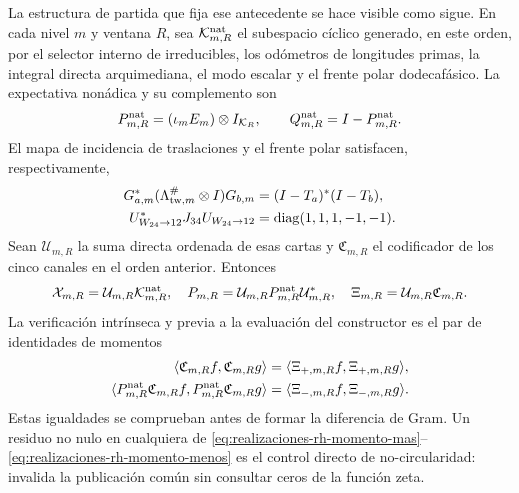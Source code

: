 La estructura de partida que fija ese antecedente se hace visible como
sigue. En cada nivel \(m\) y ventana \(R\), sea
\(\mathcal K_{m,R}^{\rm nat}\) el subespacio cíclico generado, en este
orden, por el selector interno de irreducibles, los odómetros de longitudes
primas, la integral directa arquimediana, el modo escalar y el frente polar
dodecafásico. La expectativa nonádica y su complemento son
\begin{equation}\label{eq:realizaciones-rh-proyeccion-nativa}
 P_{m,R}^{\rm nat}=(\iota_mE_m)\otimes I_{\mathcal K_R},
 \qquad Q_{m,R}^{\rm nat}=I-P_{m,R}^{\rm nat}.
\end{equation}
El mapa de incidencia de traslaciones y el frente polar satisfacen,
respectivamente,
\begin{align}
 G_{a,m}^*(\Lambda_{{\rm tw},m}^{\#}\otimes I)G_{b,m}
 &=(I-T_a)^*(I-T_b),
 \label{eq:realizaciones-rh-momentos-cruzados}\\
 U_{W_{24}\to12}^*J_{34}U_{W_{24}\to12}
 &=\operatorname{diag}(1,1,1,-1,-1).
 \label{eq:realizaciones-rh-carta-polar}
\end{align}
Sean \(\mathcal U_{m,R}\) la suma directa ordenada de esas cartas y
\(\mathfrak C_{m,R}\) el codificador de los cinco canales en el orden
anterior. Entonces
\begin{equation}\label{eq:realizaciones-rh-xi-p-fuente}
 \mathcal X_{m,R}=\mathcal U_{m,R}\mathcal K_{m,R}^{\rm nat},
 \quad
 P_{m,R}=\mathcal U_{m,R}P_{m,R}^{\rm nat}\mathcal U_{m,R}^*,
 \quad
 \Xi_{m,R}=\mathcal U_{m,R}\mathfrak C_{m,R}.
\end{equation}
La verificación intrínseca y previa a la evaluación del constructor es el
par de identidades de momentos
\begin{align}
 \langle\mathfrak C_{m,R}f,\mathfrak C_{m,R}g\rangle
 &=\langle\Xi_{+,m,R}f,\Xi_{+,m,R}g\rangle,
 \label{eq:realizaciones-rh-momento-mas}\\
 \langle P_{m,R}^{\rm nat}\mathfrak C_{m,R}f,
         P_{m,R}^{\rm nat}\mathfrak C_{m,R}g\rangle
 &=\langle\Xi_{-,m,R}f,\Xi_{-,m,R}g\rangle.
 \label{eq:realizaciones-rh-momento-menos}
\end{align}
Estas igualdades se comprueban antes de formar la diferencia de Gram. Un
residuo no nulo en cualquiera de
\eqref{eq:realizaciones-rh-momento-mas}--
\eqref{eq:realizaciones-rh-momento-menos} es el control directo de
no-circularidad: invalida la publicación común sin consultar ceros de la
función zeta.

